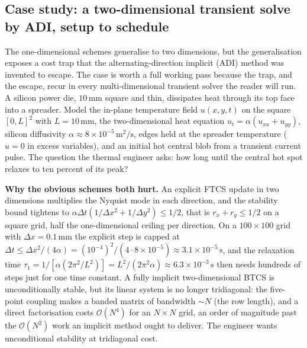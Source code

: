 \subsection{Case study: a two-dimensional transient solve by ADI, setup to schedule}

The one-dimensional schemes generalise to two dimensions, but the
generalisation exposes a cost trap that the alternating-direction
implicit (ADI) method was invented to escape. The case is worth a
full working pass because the trap, and the escape, recur in every
multi-dimensional transient solver the reader will run. A silicon
power die, $10\,\si{\milli\meter}$ square and thin, dissipates heat
through its top face into a spreader. Model the in-plane temperature
field $u(x, y, t)$ on the square $[0, L]^{2}$ with $L = 10\,\si{
\milli\meter}$, the two-dimensional heat equation $u_{t} = \alpha
(u_{xx} + u_{yy})$, silicon diffusivity $\alpha \approx 8\times
10^{-5}\,\si{\meter\squared\per\second}$, edges held at the spreader
temperature ($u = 0$ in excess variables), and an initial hot
central blob from a transient current pulse. The question the
thermal engineer asks: how long until the central hot spot relaxes
to ten percent of its peak?

\textbf{Why the obvious schemes both hurt.} An explicit FTCS update
in two dimensions multiplies the Nyquist mode in each direction, and
the stability bound tightens to $\alpha\Delta t(1/\Delta x^{2} +
1/\Delta y^{2}) \leq 1/2$, that is $r_{x} + r_{y} \leq 1/2$ on a
square grid, half the one-dimensional ceiling per direction. On a
$100\times 100$ grid with $\Delta x = 0.1\,\si{\milli\meter}$ the
explicit step is capped at $\Delta t \leq \Delta x^{2}/(4\alpha) =
(10^{-4})^{2}/(4\cdot 8\times 10^{-5}) \approx 3.1\times
10^{-5}\,\si{\second}$, and the relaxation time
$\tau_{1} = 1/[\alpha(2\pi^{2}/L^{2})] = L^{2}/(2\pi^{2}\alpha)
\approx 6.3\times 10^{-3}\,\si{\second}$ then needs hundreds of
steps just for one time constant. A fully implicit two-dimensional
BTCS is unconditionally stable, but its linear system is no longer
tridiagonal: the five-point coupling makes a banded matrix of
bandwidth $\sim N$ (the row length), and a direct factorisation
costs $\mathcal{O}(N^{4})$ for an $N\times N$ grid, an order of
magnitude past the $\mathcal{O}(N^{2})$ work an implicit method
ought to deliver. The engineer wants unconditional stability at
tridiagonal cost.

